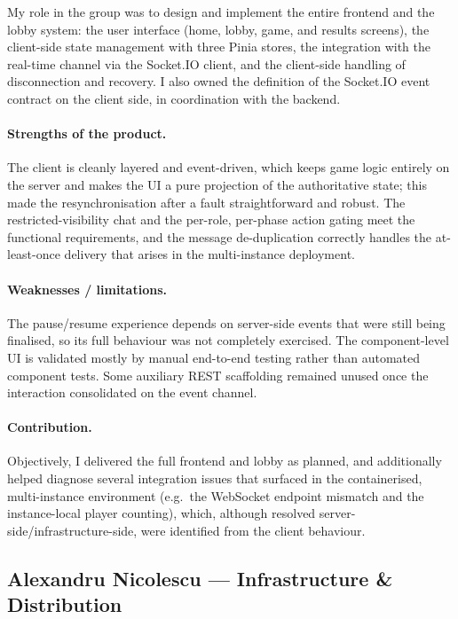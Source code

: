 \documentclass{scrartcl}
\begin{document}
My role in the group was to design and implement the entire frontend and the
lobby system: the user interface (home, lobby, game, and results screens), the
client-side state management with three Pinia stores, the integration with the
real-time channel via the Socket.IO client, and the client-side handling of
disconnection and recovery. I also owned the definition of the Socket.IO event
contract on the client side, in coordination with the backend.

\paragraph{Strengths of the product.} The client is cleanly layered and
event-driven, which keeps game logic entirely on the server and makes the UI a
pure projection of the authoritative state; this made the resynchronisation after
a fault straightforward and robust. The restricted-visibility chat and the
per-role, per-phase action gating meet the functional requirements, and the
message de-duplication correctly handles the at-least-once delivery that arises in
the multi-instance deployment.

\paragraph{Weaknesses / limitations.} The pause/resume experience depends on
server-side events that were still being finalised, so its full behaviour was not
completely exercised. The component-level UI is validated mostly by manual
end-to-end testing rather than automated component tests. Some auxiliary REST
scaffolding remained unused once the interaction consolidated on the event
channel.

\paragraph{Contribution.} Objectively, I delivered the full frontend and lobby as
planned, and additionally helped diagnose several integration issues that surfaced
in the containerised, multi-instance environment (e.g.\ the WebSocket endpoint
mismatch and the instance-local player counting), which, although resolved
server-side/infrastructure-side, were identified from the client behaviour.

\subsection{Alexandru Nicolescu --- Infrastructure \& Distribution}
\end{document}
